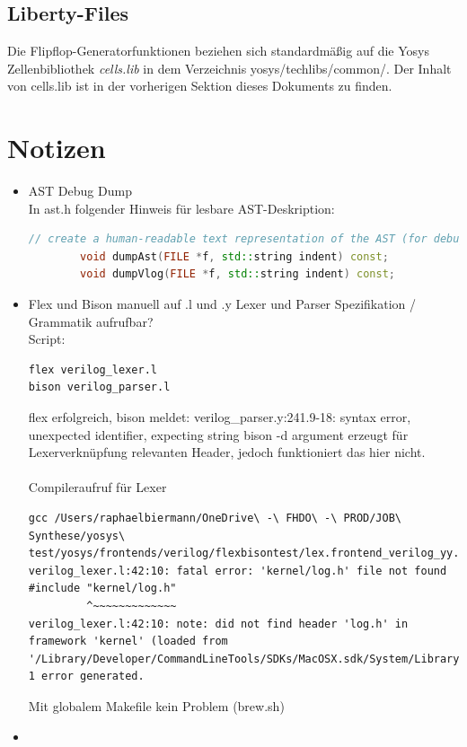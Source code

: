 \documentclass[11pt]{report}
\begin{document}
\section{Liberty-Files}
Die Flipflop-Generatorfunktionen beziehen sich standardmäßig auf die Yosys Zellenbibliothek \textit{cells.lib} in dem Verzeichnis yosys/techlibs/common/. Der Inhalt von cells.lib ist in der vorherigen Sektion dieses Dokuments zu finden.
\printbibliography

\chapter{Notizen}
\begin{itemize}
  \item AST Debug Dump \\
In ast.h folgender Hinweis für lesbare AST-Deskription:\\
\begin{lstlisting}[language=C++]
		// create a human-readable text representation of the AST (for debugging)
		void dumpAst(FILE *f, std::string indent) const;
		void dumpVlog(FILE *f, std::string indent) const;
\end{lstlisting}
\item Flex und Bison manuell auf .l und .y Lexer und Parser Spezifikation / Grammatik aufrufbar?\\
Script:
\begin{lstlisting}
flex verilog_lexer.l
bison verilog_parser.l
\end{lstlisting}
flex erfolgreich, bison meldet: verilog\_parser.y:241.9-18: syntax error, unexpected identifier, expecting string
bison -d argument erzeugt für Lexerverknüpfung relevanten Header, jedoch funktioniert das hier nicht. 
\\
\\
Compileraufruf für Lexer
\begin{lstlisting}
gcc /Users/raphaelbiermann/OneDrive\ -\ FHDO\ -\ PROD/JOB\ Synthese/yosys\ test/yosys/frontends/verilog/flexbisontest/lex.frontend_verilog_yy.c
verilog_lexer.l:42:10: fatal error: 'kernel/log.h' file not found
#include "kernel/log.h"
         ^~~~~~~~~~~~~~
verilog_lexer.l:42:10: note: did not find header 'log.h' in framework 'kernel' (loaded from '/Library/Developer/CommandLineTools/SDKs/MacOSX.sdk/System/Library/Frameworks')
1 error generated.
\end{lstlisting}
Mit globalem Makefile kein Problem
(brew.sh)
\item 


\end{itemize}
\end{document}
